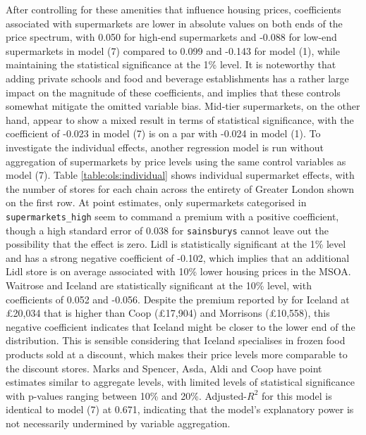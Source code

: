 \documentclass{article}
\begin{document}
After controlling for these amenities that influence housing prices, coefficients associated with supermarkets are lower in absolute values on both ends of the price spectrum, with 0.050 for high-end supermarkets and -0.088 for low-end supermarkets in model (7) compared to 0.099 and -0.143 for model (1), while maintaining the statistical significance at the 1\% level. It is noteworthy that adding private schools and food and beverage establishments has a rather large impact on the magnitude of these coefficients, and implies that these controls somewhat mitigate the omitted variable bias. Mid-tier supermarkets, on the other hand, appear to show a mixed result in terms of statistical significance, with the coefficient of -0.023 in model (7) is on a par with -0.024 in model (1). To investigate the individual effects, another regression model is run without aggregation of supermarkets by price levels using the same control variables as model (7). Table \ref{table:ols:individual} shows individual supermarket effects, with the number of stores for each chain across the entirety of Greater London shown on the first row. At point estimates, only supermarkets categorised in \texttt{supermarkets\_high} seem to command a premium with a positive coefficient, though a high standard error of 0.038 for \texttt{sainsburys} cannot leave out the possibility that the effect is zero. Lidl is statistically significant at the 1\% level and has a strong negative coefficient of -0.102, which implies that an additional Lidl store is on average associated with 10\% lower housing prices in the MSOA. Waitrose and Iceland are statistically significant at the 10\% level, with coefficients of 0.052 and -0.056. Despite the premium reported by \citet{LloydsBank2016LivingHome} for Iceland at £20,034 that is higher than Coop (£17,904) and Morrisons (£10,558), this negative coefficient indicates that Iceland might be closer to the lower end of the distribution. This is sensible considering that Iceland specialises in frozen food products sold at a discount, which makes their price levels more comparable to the discount stores. Marks and Spencer, Asda, Aldi and Coop have point estimates similar to aggregate levels, with limited levels of statistical significance with p-values ranging between 10\% and 20\%. Adjusted-$R^2$ for this model is identical to model (7) at 0.671, indicating that the model's explanatory power is not necessarily undermined by variable aggregation. 
\end{document}
